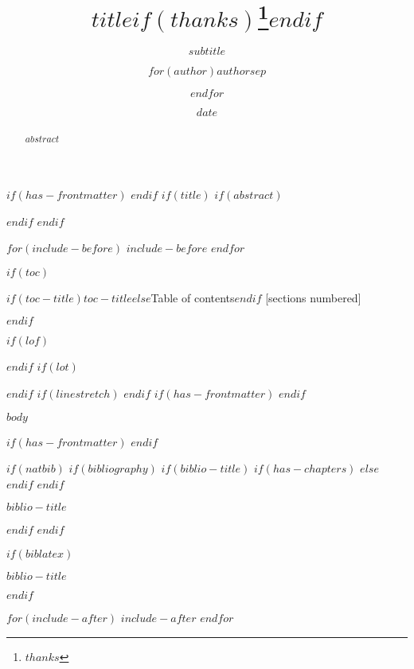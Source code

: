 \documentclass[
$if(fontsize)$
   $fontsize$,
$endif$
$if(lang)$
   $babel-lang$,
$endif$
$if(papersize)$
   $papersize$paper,
$endif$
$for(classoption)$
  $classoption$$sep$,
$endfor$
]{beamer}
\title{$title$$if(thanks)$\thanks{$thanks$}$endif$}
\subtitle{$subtitle$}
\author{$for(author)$$author$$sep$ \and $endfor$}
\date{$date$}
\institute{$for(institute)$$institute$$sep$ \and $endfor$}
\newif\ifbibliography
\begin{document}
$if(has-frontmatter)$
\frontmatter
$endif$
$if(title)$
\frame{\titlepage}
   $if(abstract)$
\begin{abstract}
   $abstract$
\end{abstract}
   $endif$
$endif$

$for(include-before)$
   $include-before$
$endfor$

$if(toc)$
\begin{frame}{$if(toc-title)$$toc-title$$else$Table of contents$endif$}
   [sections numbered]
   \tableofcontents[hideallsubsections]
\end{frame}
$endif$

$if(lof)$
\listoffigures
$endif$
$if(lot)$
\listoftables
$endif$
$if(linestretch)$
$endif$
$if(has-frontmatter)$
\mainmatter
$endif$

$body$

$if(has-frontmatter)$
\backmatter
$endif$

$if(natbib)$
   $if(bibliography)$
      $if(biblio-title)$
         $if(has-chapters)$
\renewcommand\bibname{$biblio-title$}
         $else$
\renewcommand\refname{$biblio-title$}
         $endif$
      $endif$
\begin{frame}[allowframebreaks]{$biblio-title$}
   \bibliographytrue
   
\end{frame}
   $endif$
$endif$

$if(biblatex)$
\begin{frame}[allowframebreaks]{$biblio-title$}
   \bibliographytrue
   \printbibliography[heading=none]
\end{frame}
$endif$

$for(include-after)$
   $include-after$
$endfor$
\end{document}
